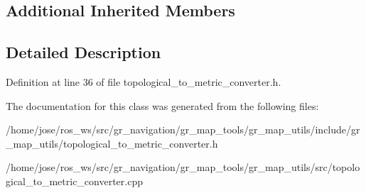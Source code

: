 \subsection*{Additional Inherited Members}


\subsection{Detailed Description}


Definition at line 36 of file topological\+\_\+to\+\_\+metric\+\_\+converter.\+h.



The documentation for this class was generated from the following files\+:\begin{DoxyCompactItemize}
\item 
/home/jose/ros\+\_\+ws/src/gr\+\_\+navigation/gr\+\_\+map\+\_\+tools/gr\+\_\+map\+\_\+utils/include/gr\+\_\+map\+\_\+utils/topological\+\_\+to\+\_\+metric\+\_\+converter.\+h\item 
/home/jose/ros\+\_\+ws/src/gr\+\_\+navigation/gr\+\_\+map\+\_\+tools/gr\+\_\+map\+\_\+utils/src/topological\+\_\+to\+\_\+metric\+\_\+converter.\+cpp\end{DoxyCompactItemize}
